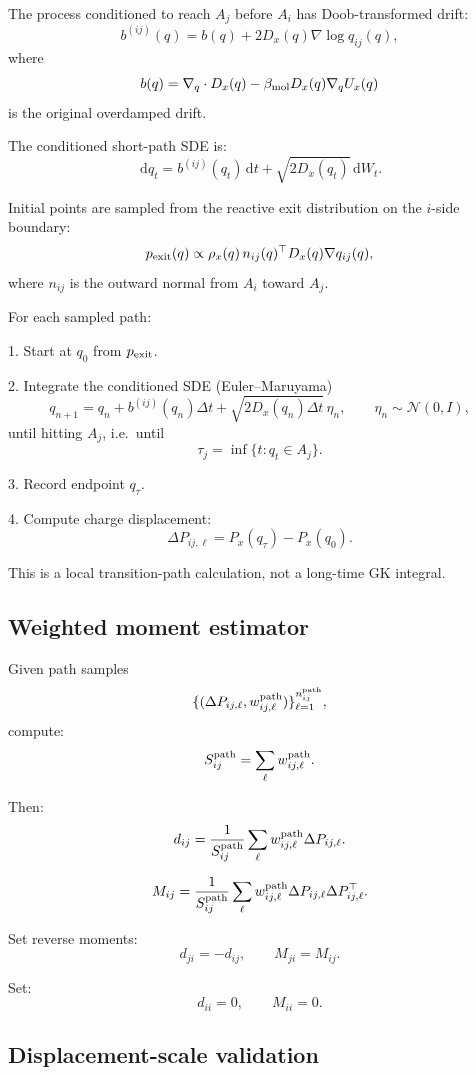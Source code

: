 \documentclass[11pt]{article}
\newcommand{\dd}{\,\mathrm d}
\begin{document}
The process conditioned to reach \(A_j\) before \(A_i\) has Doob-transformed
drift:
\[
b^{(ij)}(q)
=
b(q)+2D_x(q)\nabla\log q_{ij}(q),
\]
where
\[
b(q)=\nabla_q\cdot D_x(q)-\beta_{\rm mol}D_x(q)\nabla_q U_x(q)
\]
is the original overdamped drift.

The conditioned short-path SDE is:
\[
\dd q_t
=
b^{(ij)}(q_t)\dd t
+
\sqrt{2D_x(q_t)}\dd W_t.
\]

Initial points are sampled from the reactive exit distribution on the
\(i\)-side boundary:
\[
p_{\rm exit}(q)
\propto
\rho_x(q)
\,n_{ij}(q)^\top D_x(q)\nabla q_{ij}(q),
\]
where \(n_{ij}\) is the outward normal from \(A_i\) toward \(A_j\).

For each sampled path:

1. Start at \(q_0\) from \(p_{\rm exit}\).

2. Integrate the conditioned SDE (Euler--Maruyama)
\[
q_{n+1}
=
q_n
+
b^{(ij)}(q_n)\Delta t
+
\sqrt{2D_x(q_n)\Delta t}\,\eta_n,
\qquad
\eta_n\sim\mathcal N(0,I),
\]
until hitting \(A_j\), i.e.\ until
\[
\tau_j=\inf\{t:q_t\in A_j\}.
\]

3. Record endpoint \(q_\tau\).

4. Compute charge displacement:
\[
\Delta P_{ij,\ell}=P_x(q_\tau)-P_x(q_0).
\]

This is a local transition-path calculation, not a long-time GK integral.

\subsection{Weighted moment estimator}

Given path samples
\[
\{(\Delta P_{ij,\ell},w_{ij,\ell}^{\rm path})\}_{\ell=1}^{n_{ij}^{\rm path}},
\]
compute:
\[
S_{ij}^{\rm path}=\sum_\ell w_{ij,\ell}^{\rm path}.
\]

Then:
\[
d_{ij}
=
\frac{1}{S_{ij}^{\rm path}}
\sum_\ell
w_{ij,\ell}^{\rm path}\Delta P_{ij,\ell}.
\]

\[
M_{ij}
=
\frac{1}{S_{ij}^{\rm path}}
\sum_\ell
w_{ij,\ell}^{\rm path}
\Delta P_{ij,\ell}\Delta P_{ij,\ell}^{\top}.
\]

Set reverse moments:
\[
d_{ji}=-d_{ij},
\qquad
M_{ji}=M_{ij}.
\]

Set:
\[
d_{ii}=0,
\qquad
M_{ii}=0.
\]

\subsection{Displacement-scale validation}
\end{document}

